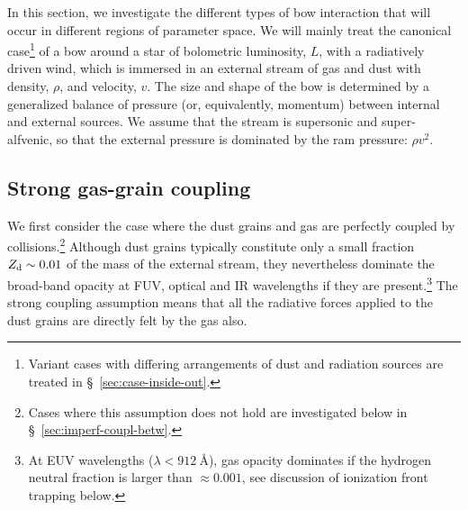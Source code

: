 In this section, we investigate the different types of bow interaction
that will occur in different regions of parameter space. We will
mainly treat the canonical case\footnote{%
  Variant cases with differing arrangements of dust and radiation
  sources are treated in \S~\ref{sec:case-inside-out}.} %
of a bow around a star of bolometric luminosity, \(L\), with a
radiatively driven wind, which is immersed in an external stream of
gas and dust with density, \(\rho\), and velocity, \(v\).  The size and
shape of the bow is determined by a generalized balance of pressure
(or, equivalently, momentum) between internal and external sources.
We assume that the stream is supersonic and super-alfvenic, so that
the external pressure is dominated by the ram pressure: \(\rho v^2\).

\subsection{Strong gas-grain coupling}
\label{sec:strong-gas-grain}

We first consider the case where the dust grains and gas are perfectly
coupled by collisions.\footnote{%
  Cases where this assumption does not hold are investigated below in
  \S~\ref{sec:imperf-coupl-betw}.} %
Although dust grains typically constitute only a small fraction
\(Z_{\text{d}} \sim 0.01\) of the mass of the external stream, they
nevertheless dominate the broad-band opacity at FUV, optical and IR
wavelengths if they are present.\footnote{%
  At EUV wavelengths (\(\lambda < \SI{912}{\angstrom}\)), gas opacity
  dominates if the hydrogen neutral fraction is larger than
  \(\approx 0.001\), see discussion of ionization front trapping
  below.} %
The strong coupling assumption means that all the radiative forces
applied to the dust grains are directly felt by the gas also.

